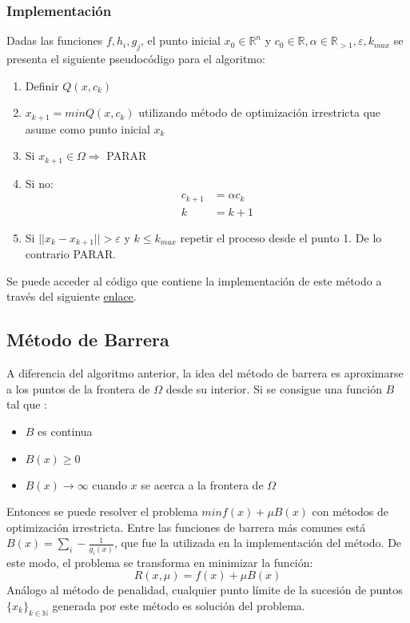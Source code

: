 \documentclass[titlepage, 11pt]{scrartcl}
\begin{document}
	\subsubsection{Implementación}
	Dadas las funciones $f, h_i, g_j$, el punto inicial $x_0 \in \mathbb{R}^n$ y $c_0 \in \mathbb{R}, \alpha \in \mathbb{R}_{> 1}, \varepsilon, k_{max}$ se presenta el siguiente pseudocódigo para el algoritmo:
	\begin{enumerate}
		\item Definir $Q(x, c_k)$
		\item $x_{k + 1} = min Q(x, c_k)$ utilizando método de optimización irrestricta que asume como punto inicial $x_k$
		\item Si $x_{k + 1} \in \Omega \Rightarrow$ PARAR
		\item Si no: 
		\begin{align*}
			c_{k + 1} &= \alpha c_k\\
			k &= k + 1
		\end{align*}
		\item Si $||x_k - x_{k+ 1}|| > \varepsilon$ y $k \leq k_{max}$ repetir el proceso desde el punto 1. De lo contrario PARAR.
	\end{enumerate}

	Se puede acceder al código que contiene la implementación de este método a través del siguiente \href{methods.py}{enlace}.
	
	\subsection{Método de Barrera}
	A diferencia del algoritmo anterior, la idea del método de barrera es aproximarse a los puntos de la frontera de $\Omega$ desde su interior. Si se consigue una función $B$ tal que :
	\begin{itemize}
		\item $B$ es continua
		\item $B(x) \geq 0$
		\item $B(x) \rightarrow \infty$ cuando $x$ se acerca a la frontera de $\Omega$
	\end{itemize}
	Entonces se puede resolver el problema $min f(x) + \mu B(x)$ con métodos de optimización irrestricta. Entre las funciones de barrera más comunes está $B(x) = \sum_{i}-\frac{1}{g_i(x)}$, que fue la utilizada en la implementación del método. De este modo, el problema se transforma en minimizar la función:
	\begin{equation*}
		R(x, \mu) = f(x) + \mu B(x)
	\end{equation*}
	Análogo al método de penalidad, cualquier punto límite de la sucesión de puntos $\{x_k\}_{k \in \mathbb{N}}$ generada por este método es solución del problema.
	
\end{document}
